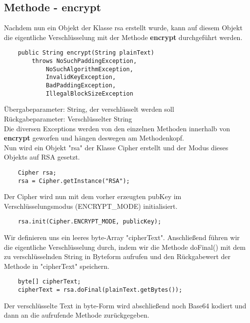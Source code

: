 \documentclass[12pt]{article}
\begin{document}
\subsection{Methode - encrypt}

Nachdem nun ein Objekt der Klasse rsa erstellt wurde, kann auf diesem Objekt die eigentliche Verschlüsselung mit der Methode \textbf{encrypt} durchgeführt werden.

\begin{lstlisting}
    public String encrypt(String plainText)
        throws NoSuchPaddingException,
            NoSuchAlgorithmException,
            InvalidKeyException,
            BadPaddingException,
            IllegalBlockSizeException
\end{lstlisting}

Übergabeparameter: String, der verschlüsselt werden soll \\
Rückgabeparameter: Verschlüsselter String \\

Die diversen Exceptions werden von den einzelnen Methoden innerhalb von \textbf{encrypt} geworfen und hängen deswegen am Methodenkopf. \\

Nun wird ein Objekt "rsa" der Klasse Cipher erstellt und der Modus dieses Objekts auf RSA gesetzt.

\begin{lstlisting}
    Cipher rsa;
    rsa = Cipher.getInstance("RSA");
\end{lstlisting}

Der Cipher wird nun mit dem vorher erzeugten pubKey im Verschlüsselungsmodus (ENCRYPT\_MODE) initialisiert.

\begin{lstlisting}
    rsa.init(Cipher.ENCRYPT_MODE, publicKey);
\end{lstlisting}

Wir definieren uns ein leeres byte-Array "cipherText".
Anschließend führen wir die eigentliche Verschlüsselung durch, indem wir die Methode doFinal() mit dem zu verschlüsselnden String in Byteform aufrufen und den Rückgabewert der Methode in "cipherText" speichern.

\begin{lstlisting}
    byte[] cipherText;
    cipherText = rsa.doFinal(plainText.getBytes());
\end{lstlisting}

Der verschlüsselte Text in byte-Form wird abschließend noch Base64 kodiert und dann an die aufrufende Methode zurückgegeben.
\end{document}
